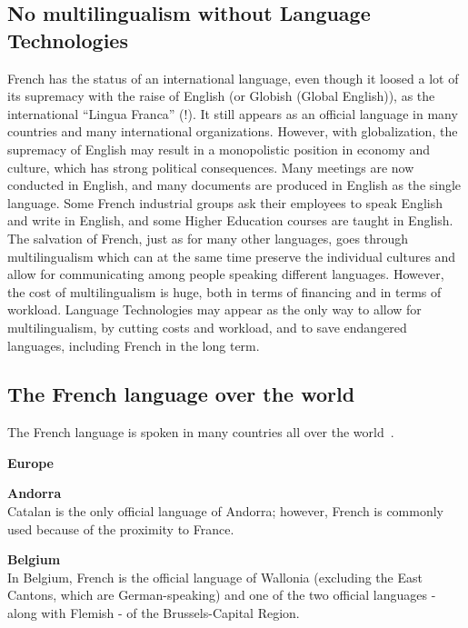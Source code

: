 \begin{multicols}{2}
\subsection{No multilingualism without Language Technologies}

French has the status of an international language, even though it
loosed a lot of its supremacy with the raise of English (or Globish
(Global English)), as the international ``Lingua Franca'' (!). It still
appears as an official language in many countries and many
international organizations. However, with globalization, the
supremacy of English may result in a monopolistic position in economy
and culture, which has strong political consequences. Many meetings
are now conducted in English, and many documents are produced in
English as the single language. Some French industrial groups ask
their employees to speak English and write in English, and some Higher
Education courses are taught in English. The salvation of French, just
as for many other languages, goes through multilingualism which can at
the same time preserve the individual cultures and allow for
communicating among people speaking different languages. However, the
cost of multilingualism is huge, both in terms of financing and in
terms of workload. Language Technologies may appear as the only way to
allow for multilingualism, by cutting costs and workload, and to save
endangered languages, including French in the long term.

\subsection{The French language over the world}
\label{frenchLanguageInTheWorldEn}
The French language is spoken in many countries all over the world~\cite{francais}.

\vspace{1cm}
\begin{center}
{\bf {\sc Europe}}
\end{center}

{\bf Andorra}\\
Catalan is the only official language of Andorra; however, French is
commonly used because of the proximity to France.

{\bf Belgium}\\ 
In Belgium, French is the official language of Wallonia (excluding the
East Cantons, which are German-speaking) and one of the two official
languages - along with Flemish - of the Brussels-Capital Region.


\end{multicols}
